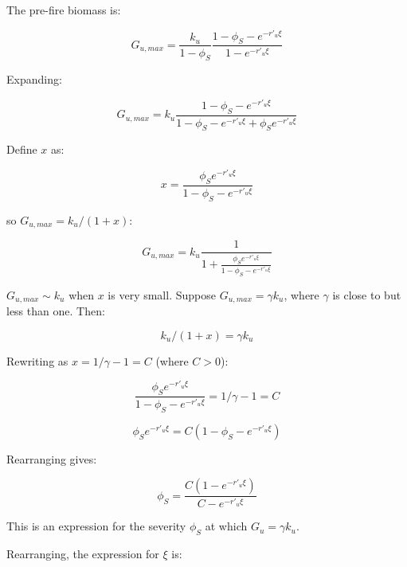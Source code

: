 \documentclass{article}
\begin{document}
The  pre-fire biomass is:

\begin{equation}
  G_{u,max} =  \frac{k_u }{1-\phi_S}   \frac{1- \phi_S - e^{-r'_u \xi} }{1 - e^{-r'_u \xi}}
  \label{G_u_max}
\end{equation}

Expanding:

\begin{equation}
  G_{u,max} =  k_u  \frac{1- \phi_S - e^{-r'_u \xi} }{1  - \phi_S - e^{-r'_u \xi} + \phi_S  e^{-r'_u \xi}}
\end{equation}

Define $x$ as:

\begin{equation}
x = \frac{ \phi_S  e^{-r'_u \xi}}{1- \phi_S - e^{-r'_u \xi}}
\end{equation}

so $ G_{u,max} = k_u /(1+x)$:

\begin{equation}
G_{u,max}  = k_u \frac{1}{1 + \frac{ \phi_S  e^{-r'_u \xi}}{1- \phi_S - e^{-r'_u \xi}}}
\end{equation}


$G_{u,max} \sim k_u$ when $x$ is very small.
Suppose $G_{u,max} = \gamma k_u$, where $\gamma$ is close to but less than one.  Then:


\begin{equation}
 k_u /(1+x) = \gamma k_u
\end{equation}

Rewriting as  $x = 1/\gamma  - 1= C$ (where $C> 0$):

\begin{equation}
 \frac{ \phi_S  e^{-r'_u \xi}}{1- \phi_S - e^{-r'_u \xi}} =  1/\gamma  - 1 = C
\end{equation}

\begin{equation}
{ \phi_S  e^{-r'_u \xi}} = C ({1- \phi_S - e^{-r'_u \xi}} )
\end{equation}

Rearranging gives:

\begin{equation}
 \phi_S   =  \frac{C(1 - e^{-r'_u \xi})}{C  - e^{-r'_u \xi}}
 \label{phi_S_RI}
 \end{equation}

This is an expression for the severity $ \phi_S $ at which $G_u = \gamma k_u$.

Rearranging, the expression for $\xi$ is:
\end{document}

